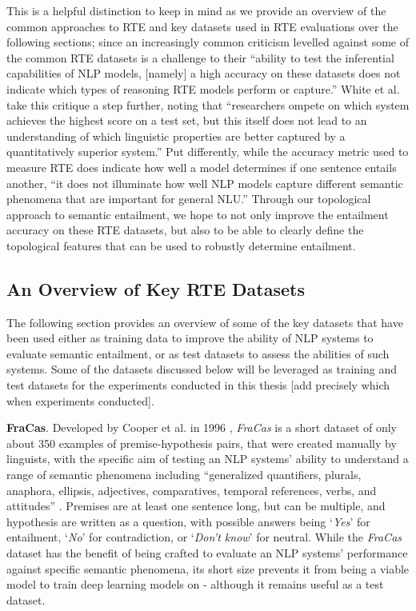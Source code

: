 \documentclass[12pt,twoside]{report}
\begin{document}
This is a helpful distinction to keep in mind as we provide an overview of the common approaches to RTE and key datasets used in RTE evaluations over the following sections; since an increasingly common criticism levelled against some of the common RTE datasets is a challenge to their ``ability to test the inferential capabilities of NLP models, [namely] a high accuracy on these datasets does not indicate which types of reasoning RTE models perform or capture.'' \cite{poliak-2020-survey} White et al. take this critique a step further, noting that ``researchers ompete on which system achieves the highest score on a test set, but this itself does not lead to an understanding of which linguistic properties are better captured by a quantitatively superior system.'' \cite{white-etal-2017-inference} Put differently, while the accuracy metric used to measure RTE does indicate how well a model determines if one sentence entails another, ``it does not illuminate how well NLP models capture different semantic phenomena that are important for general NLU.'' \cite{poliak-2020-survey} Through our topological approach to semantic entailment, we hope to not only improve the entailment accuracy on these RTE datasets, but also to be able to clearly define the topological features that can be used to robustly determine entailment.

\subsection{An Overview of Key RTE Datasets} 

The following section provides an overview of some of the key datasets that have been used either as training data to improve the ability of NLP systems to evaluate semantic entailment, or as test datasets to assess the abilities of such systems. Some of the datasets discussed below will be leveraged as training and test datasets for the experiments conducted in this thesis [add precisely which when experiments conducted]. \newline \par

\textbf{FraCas}. Developed by Cooper et al. in 1996 \cite{CooperFracas},   \textit{FraCas} is a short dataset of only about 350 examples of premise-hypothesis pairs, that were created manually by linguists, with the specific aim of testing an NLP systems' ability to understand a range of semantic phenomena including ``generalized quantifiers, plurals, anaphora, ellipsis, adjectives, comparatives, temporal references, verbs, and attitudes'' \cite{poliak-2020-survey}. Premises are at least one sentence long, but can be multiple, and hypothesis are written as a question, with possible answers being `\textit{Yes}' for entailment, `\textit{No}' for contradiction, or `\textit{Don't know}' for neutral. While the \textit{FraCas} dataset has the benefit of being crafted to evaluate an NLP systems' performance against specific semantic phenomena, its short size prevents it from being a viable model to train deep learning models on - although it remains useful as a test dataset. \newline \par
\end{document}

